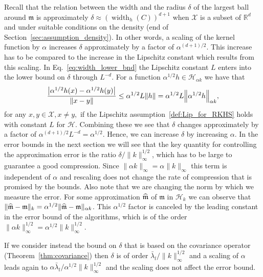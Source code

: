 \documentclass[AHL,Unicode,longabstracts,published]{cedram}
\theoremstyle{remark}
\DeclareMathOperator{\diam}{width}
\newcommand{\R}{\mathbb{R}}
\newcommand{\X}{\mathcal{X}}
\newcommand{\cH}{\mathcal{H}}
\newcommand{\mean}{\mathfrak{m}}
\let\oldhat\hat
\renewcommand*{\hat}[1]{\mathchoice{\widehat{#1}}{\widehat{#1}}{\oldhat{#1}}{\oldhat{#1}}}
\let\originalleft\left
\let\originalright\right
\renewcommand{\left}{\mathopen{}\mathclose\bgroup\originalleft}
\renewcommand{\right}{\aftergroup\egroup\originalright}
\begin{document}
Recall that the relation between the width and the radius $\delta$ of the largest ball around $\mean$ is approximately $\delta \approx (\diam_h(C))^{d+1}$ when $\X$ is a subset of $\R^d$ and under suitable conditions on the density (end of Section~\ref{sec:assumption_density}). In other words, a scaling of the kernel function by $\alpha$ increases $\delta$ approximately by a factor of $\alpha^{(d+1)/2}$. This increase has to be compared to the increase in the Lipschitz constant which results from this scaling. In Eq.~\eqref{eq:width_lower_bnd} the Lipschitz constant $L$ enters into the lower bound on $\delta$ through $L^{-d}$. For a function $\alpha^{1/2} h \in \cH_{\alpha k}$ we have that
\[
\frac{\left|\alpha^{1/2} h(x) - \alpha^{1/2} h(y)\right|}{\|x-y\|} \leq \alpha^{1/2} L \|h\| = \alpha^{1/2} L \left\|\alpha^{1/2} h\right\|_{\alpha k},
\]
for any $x,y \in \X, x \not = y,$ if the Lipschitz assumption~\eqref{def:Lip_for_RKHS} holds with constant $L$ for $\cH$. Combining these we see that $\delta$ changes approximately by a factor of $\alpha^{(d+1)/2} L^{-d} = \alpha^{1/2}$. Hence, we can increase $\delta$ by increasing $\alpha$. In the error bounds in the next section we will see that the key quantity for controlling the approximation error is the ratio $\delta/\|k\|^{1/2}_\infty$, which has to be large to guarantee a good compression. Since $\|\alpha k\|_\infty = \alpha \|k\|_\infty$ this term is independent of $\alpha$ and rescaling does not change the rate of compression that is promised by the bounds. Also note that we are changing the norm by which we measure the error. For some approximation $\hat \mean$ of $\mean$ in $\cH_k$ we can observe that $\|\hat \mean - \mean\|_k = \alpha^{1/2} \| \hat \mean - \mean \|_{\alpha k}$. This $\alpha^{1/2}$ factor is canceled by the leading constant in the error bound of the algorithms, which is of the order $\|\alpha k\|_\infty^{1/2} = \alpha^{1/2} \|k\|^{1/2}_\infty$.

If we consider instead the bound on $\delta$ that is based on the covariance operator (Theorem~\ref{thm:covariance}) then $\delta$ is of order $\bar \lambda_l/\|k\|_\infty^{1/2}$ and a scaling of $\alpha$ leads again to $\alpha \bar \lambda_l / \alpha^{1/2} \|k\|_\infty^{1/2}$ and the scaling does not affect the error bound.
\end{document}
